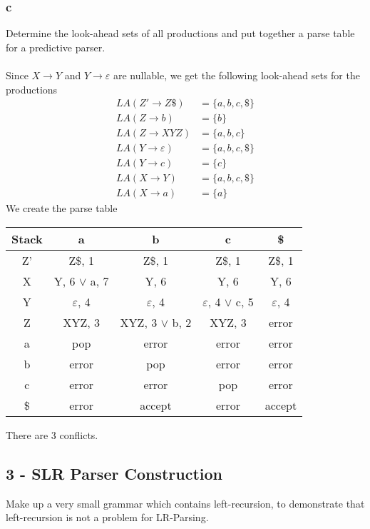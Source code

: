 \documentclass[12pt]{article}
\begin{document}
\subsubsection*{c}
Determine the look-ahead sets of all productions and put together a parse table for a predictive parser.\\
\\
Since $X\rightarrow Y$ and $Y\rightarrow \varepsilon$ are nullable, we get the following look-ahead sets for the productions
\begin{align}
LA(Z'\rightarrow Z\$ ) &= \{a,b,c,\$\}  \\
LA(Z\rightarrow b)&=\{b\} \\
LA(Z\rightarrow XYZ)&=\{a,b,c\} \\
LA(Y\rightarrow \varepsilon)&=\{a,b,c,\$\} \\
LA(Y\rightarrow c) &= \{c\} \\
LA(X\rightarrow Y) &= \{a,b,c,\$\} \\
LA(X\rightarrow a) &= \{a\}
\end{align}
\newpage
$ $\\
We create the parse table
\begin{center}
\begin{tabular}{c|c|c|c|c} 
Stack & a & b & c & \$ \\ 
\hline 
Z' & Z\$, 1 & Z\$, 1 & Z\$, 1 & Z\$, 1\\ 
\hline 
X & Y, 6 $\vee$ a, 7  & Y, 6 & Y, 6 & Y, 6 \\ 
\hline 
Y & $\varepsilon$, 4 & $\varepsilon$, 4  & $\varepsilon$, 4 $\vee$ c, 5  & $\varepsilon$, 4 \\ 
\hline 
Z & XYZ, 3 & XYZ, 3 $\vee$ b, 2 & XYZ, 3 & error \\ 
\hline 
a & pop & error & error & error \\ 
\hline 
b & error & pop & error & error \\ 
\hline 
c & error & error & pop & error \\ 
\hline 
\$ & error & accept & error & accept \\ 
\hline 
\end{tabular}
\end{center}
$ $\\
There are 3 conflicts.
\newpage

\subsection*{3 - SLR Parser Construction}
Make up a very small grammar which contains left-recursion, to demonstrate that left-recursion is not a problem for LR-Parsing.
\end{document}
